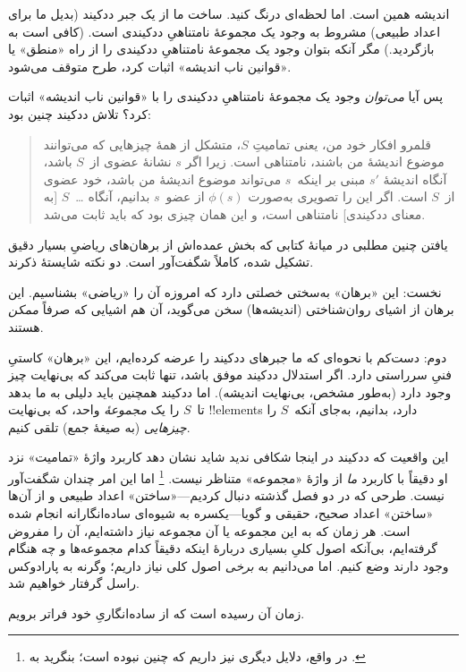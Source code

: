 \documentclass[../../../include/open-logic-section]{subfiles}
\begin{document}
اندیشه همین است. اما لحظه‌ای درنگ کنید. ساخت ما از یک جبر ددکیند (بدیل ما
برای اعداد طبیعی) مشروط به وجود یک مجموعهٔ نامتناهیِ ددکیندی است. (کافی
است به 
بازگردید.) مگر آنکه بتوان وجود یک مجموعهٔ نامتناهیِ ددکیندی را از راه
«منطق» یا «قوانین ناب اندیشه» اثبات کرد، طرح متوقف می‌شود.

پس آیا \emph{می‌توان} وجود یک مجموعهٔ نامتناهیِ ددکیندی را با «قوانین ناب
اندیشه» اثبات کرد؟ تلاش ددکیند چنین بود:
\begin{quote}
  قلمرو افکار خود من، یعنی تمامیتِ $S$، متشکل از همهٔ چیزهایی که می‌توانند موضوع
  اندیشهٔ من باشند، نامتناهی است. زیرا اگر $s$ نشانهٔ عضوی از~$S$ باشد،
  آنگاه اندیشهٔ $s'$ مبنی بر اینکه~$s$ می‌تواند موضوع اندیشهٔ من باشد،
  خود عضوی از~$S$ است. اگر این را تصویری به‌صورت $\phi(s)$ از عضو~$s$ بدانیم،
  آنگاه \dots~$S$ [به معنای ددکیندی] نامتناهی است، و این همان چیزی بود
  که باید ثابت می‌شد.
	\citep[\S66]{Dedekind1888}
\end{quote}
یافتن چنین مطلبی در میانهٔ کتابی که بخش عمده‌اش از برهان‌های ریاضیِ بسیار
دقیق تشکیل شده، کاملاً شگفت‌آور است. دو نکته شایستهٔ ذکرند.

نخست: این «برهان» به‌سختی خصلتی دارد که امروزه آن را «ریاضی» بشناسیم. این
برهان از اشیای روان‌شناختی (اندیشه‌ها) سخن می‌گوید، آن هم اشیایی که صرفاً
\emph{ممکن} هستند.

دوم: دست‌کم با نحوه‌ای که ما جبرهای ددکیند را عرضه کرده‌ایم، این «برهان»
کاستیِ فنیِ سرراستی دارد. اگر استدلال ددکیند موفق باشد، تنها ثابت می‌کند
که بی‌نهایت چیز وجود دارد (به‌طور مشخص، بی‌نهایت اندیشه). اما ددکیند همچنین
باید دلیلی به ما بدهد تا~$S$ را یک \emph{مجموعهٔ} واحد، که بی‌نهایت
!!{element}s دارد، بدانیم، به‌جای آنکه~$S$ را \emph{چیزهایی} (به صیغهٔ
جمع) تلقی کنیم.

این واقعیت که ددکیند در اینجا شکافی ندید شاید نشان دهد کاربرد واژهٔ
«تمامیت» نزد او دقیقاً با کاربرد \emph{ما} از واژهٔ «مجموعه» متناظر نیست.
\footnote{در واقع، دلایل دیگری نیز داریم که چنین نبوده است؛ بنگرید به
\citet[ص.~23]{Potter2004}.} اما این امر چندان شگفت‌آور نیست. طرحی که در دو
فصل گذشته دنبال کردیم---«ساختن» اعداد طبیعی و از آن‌ها «ساختن» اعداد صحیح،
حقیقی و گویا---یکسره به شیوه‌ای ساده‌انگارانه انجام شده است. هر زمان که به
این مجموعه یا آن مجموعه نیاز داشته‌ایم، آن را مفروض گرفته‌ایم، بی‌آنکه
اصول کلیِ بسیاری دربارهٔ اینکه دقیقاً کدام مجموعه‌ها و چه هنگام وجود دارند
وضع کنیم. اما می‌دانیم به \emph{برخی} اصول کلی نیاز داریم؛ وگرنه به
پارادوکس راسل گرفتار خواهیم شد.

زمان آن رسیده است که از ساده‌انگاریِ خود فراتر برویم.
\end{document}

